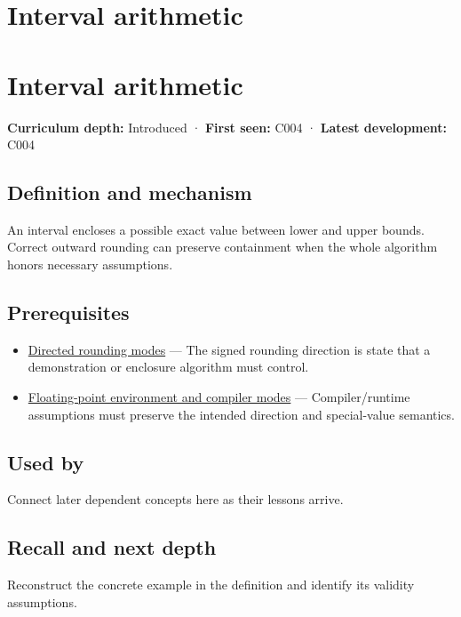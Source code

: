 \hypertarget{appendix-1823a14330cb}{}
\section*{Interval arithmetic}
\section{Interval arithmetic}\label{interval-arithmetic}

\textbf{Curriculum depth:} Introduced · \textbf{First seen:} C004 · \textbf{Latest development:} C004

\subsection{Definition and mechanism}\label{definition-and-mechanism}

An interval encloses a possible exact value between lower and upper bounds. Correct outward rounding can preserve containment when the whole algorithm honors necessary assumptions.

\subsection{Prerequisites}\label{prerequisites}

\begin{itemize}
\tightlist
\item
  \hyperref[appendix-637d164ae5ca]{Directed rounding modes} --- The signed rounding direction is state that a demonstration or enclosure algorithm must control.
\item
  \hyperref[appendix-f11d1a521253]{Floating-point environment and compiler modes} --- Compiler/runtime assumptions must preserve the intended direction and special-value semantics.
\end{itemize}

\subsection{Used by}\label{used-by}

Connect later dependent concepts here as their lessons arrive.

\subsection{Recall and next depth}\label{recall-and-next-depth}

Reconstruct the concrete example in the definition and identify its validity assumptions.

